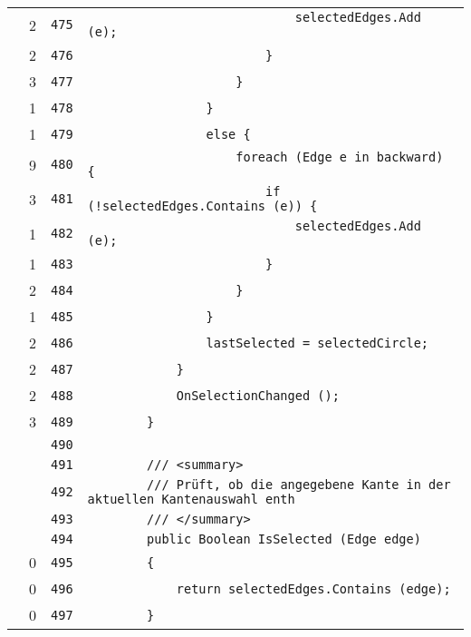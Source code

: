\documentclass[a4paper,10pt]{article}
\begin{document}
\begin{longtable}[l]{lrrl}
\cellcolor{green} & 2 & \verb~475~ & \verb~                            selectedEdges.Add (e);~\\
\cellcolor{green} & 2 & \verb~476~ & \verb~                        }~\\
\cellcolor{green} & 3 & \verb~477~ & \verb~                    }~\\
\cellcolor{green} & 1 & \verb~478~ & \verb~                }~\\
\cellcolor{green} & 1 & \verb~479~ & \verb~                else {~\\
\cellcolor{green} & 9 & \verb~480~ & \verb~                    foreach (Edge e in backward) {~\\
\cellcolor{green} & 3 & \verb~481~ & \verb~                        if (!selectedEdges.Contains (e)) {~\\
\cellcolor{green} & 1 & \verb~482~ & \verb~                            selectedEdges.Add (e);~\\
\cellcolor{green} & 1 & \verb~483~ & \verb~                        }~\\
\cellcolor{green} & 2 & \verb~484~ & \verb~                    }~\\
\cellcolor{green} & 1 & \verb~485~ & \verb~                }~\\
\cellcolor{green} & 2 & \verb~486~ & \verb~                lastSelected = selectedCircle;~\\
\cellcolor{green} & 2 & \verb~487~ & \verb~            }~\\
\cellcolor{green} & 2 & \verb~488~ & \verb~            OnSelectionChanged ();~\\
\cellcolor{green} & 3 & \verb~489~ & \verb~        }~\\
\cellcolor{gray} &  & \verb~490~ & \verb~~\\
\cellcolor{gray} &  & \verb~491~ & \verb~        /// <summary>~\\
\cellcolor{gray} &  & \verb~492~ & \verb~        /// Prüft, ob die angegebene Kante in der aktuellen Kantenauswahl enth~\\
\cellcolor{gray} &  & \verb~493~ & \verb~        /// </summary>~\\
\cellcolor{gray} &  & \verb~494~ & \verb~        public Boolean IsSelected (Edge edge)~\\
\cellcolor{red} & 0 & \verb~495~ & \verb~        {~\\
\cellcolor{red} & 0 & \verb~496~ & \verb~            return selectedEdges.Contains (edge);~\\
\cellcolor{red} & 0 & \verb~497~ & \verb~        }~\\

\end{longtable}
\end{document}
